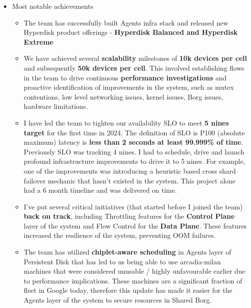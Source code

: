 \documentclass[10pt,a4paper,sans]{moderncv}
\begin{document}
{\begin{itemize}
\begin{itemize}
			\item I am leading an infra team that has been building \textbf{a new generation stack} for Persistent Disk (Agents stack).
			\item Our latency on a 4k block size workload is an impressive \textbf{400 microseconds at P50}.
			\item We can support \textbf{1 TB/s/cell} throughput already now, and are aiming to support 10TB/s by the end of 2025.
		\end{itemize}
		\item Most notable achievements \begin{itemize}
			\item The team has successfully built Agents infra stack and released new Hyperdisk product offerings - \textbf{Hyperdisk Balanced and Hyperdisk Extreme}
			\item We have achieved several \textbf{scalability} milestones of \textbf{10k devices per cell} and subsequently \textbf{50k devices per cell}. This involved establishing flows in the team to drive continuous \textbf{performance investigations} and proactive identification of improvements in the system, such as mutex contentions, low level networking issues, kernel issues, Borg issues, hardware limitations.
			\item I have led the team to tighten our availability SLO to meet \textbf{5 nines target} for the first time in 2024. The definition of SLO is P100 (absolute maximum) latency is \textbf{less than 2 seconds at least 99.999\% of time}. Previously SLO was tracking 4 nines. I had to schedule, drive and launch profound infrastructure improvements to drive it to 5 nines. For example, one of the improvements was introducing a heuristic based cross shard failover mechanic that hasn't existed in the system. This project alone had a 6 month timeline and was delivered on time.
			\item I've put several critical initiatives (that started before I joined the team) \textbf{back on track}, including Throttling features for the \textbf{Control Plane} layer of the system and Flow Control for the \textbf{Data Plane}. These features increased the resilience of the system, preventing OOM failures.
			\item The team has utilized \textbf{chiplet-aware scheduling} in Agents layer of Persistent Disk that has led to us being able to use arcadia-milan machines that were considered unusable / highly unfavourable earlier due to performance implications. These machines are a significant fraction of fleet in Google today, therefore this update has made it easier for the Agents layer of the system to secure resources in Shared Borg.

\end{itemize}
\end{itemize}}
\end{document}
